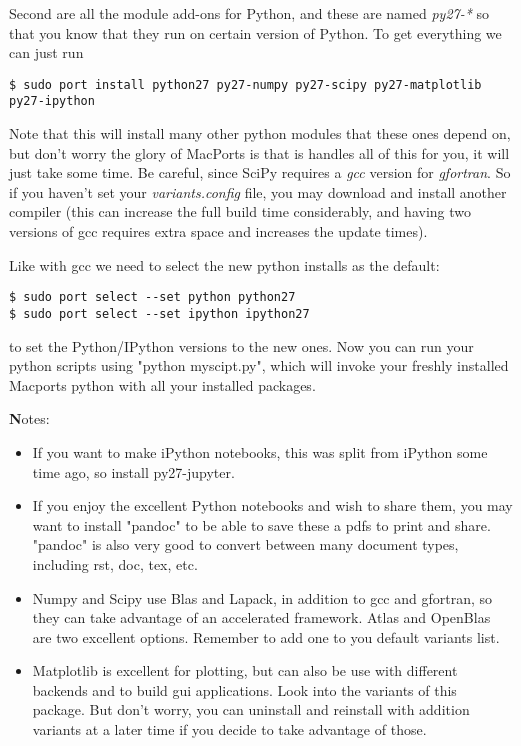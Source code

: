 \documentclass[11pt, A4paper]{article}
\begin{document}
Second are all the module add-ons for Python, and these are named \textit{py27-*} so that you know that they run on certain version of Python. To get everything we can just run
\begin{lstlisting}[style=Bash]
$ sudo port install python27 py27-numpy py27-scipy py27-matplotlib py27-ipython
\end{lstlisting}
Note that this will install many other python modules that these ones depend on, but don't worry the glory of MacPorts is that is handles all of this for you, it will just take some time. Be careful, since SciPy requires a \textit{gcc} version for \textit{gfortran}. So if you haven't set your \textit{variants.config} file, you may download and install another compiler (this can increase the full build time considerably, and having two versions of gcc requires extra space and increases the update times).

Like with gcc we need to select the new python installs as the default:
\begin{lstlisting}[style=Bash]
$ sudo port select --set python python27
$ sudo port select --set ipython ipython27
\end{lstlisting}
to set the Python/IPython versions to the new ones. Now you can run your python scripts using "python myscipt.py", which will invoke your freshly installed Macports python with all your installed packages.

{\textbf Notes:}
\begin{itemize}
	\item If you want to make iPython notebooks, this was split from iPython some time ago, so install py27-jupyter.
	\item If you enjoy the excellent Python notebooks and wish to share them, you may want to install "pandoc" to be able to save these a pdfs to print and share. "pandoc" is also very good to convert between many document types, including rst, doc, tex, etc.
	\item Numpy and Scipy use Blas and Lapack, in addition to gcc and gfortran, so they can take advantage of an accelerated framework. Atlas and OpenBlas are two excellent options. Remember to add one to you default variants list.
	\item Matplotlib is excellent for plotting, but can also be use with different backends and to build gui applications. Look into the variants of this package. But don't worry, you can uninstall and reinstall with addition variants at a later time if you decide to take advantage of those.
\end{itemize}
\end{document}
